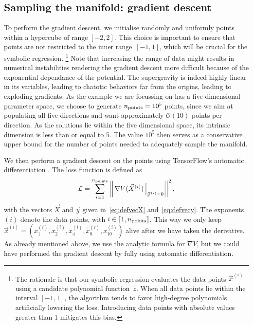 \documentclass[11pt,a4paper]{article}
\begin{document}
	\subsection{Sampling the manifold: gradient descent} \label{sec:graddes}
	To perform the gradient descent, we initialise randomly and uniformly points within a hypercube of range $[-2,2]$. This choice is important to ensure that points are not restricted to the inner range~$[-1,1]$, which will be crucial for the symbolic regression. \footnote{The rationale is that our symbolic regression evaluates the data points $\vec{x}^{(i)}$ using a candidate polynomial function~$z$. When all data points lie within the interval $[-1, 1]$, the algorithm tends to favor high-degree polynomials artificially lowering the loss. Introducing data points with absolute values greater than 1 mitigates this bias.}  Note that increasing the range of data might results in numerical instabilities rendering the gradient descent more difficult because of the exponential dependance of the potential. The supergravity is indeed highly linear in its variables, leading to chatotic behaviors far from the origins, leading to exploding gradients. As the example we are focussing on has a five-dimensional parameter space, we choose to generate $n_{\rm points}=10^5$ points, since we aim at populating all five directions and want approximately $\mathcal{O}(10)$ points per direction. As the solutions lie within the five dimensional space, its intrinsic dimension is less than or equal to 5. The value $10^5$ then serves as a conservative upper bound for the number of points needed to adequately sample the manifold.
	
	We then perform a gradient descent on the points using TensorFlow’s automatic differentiation \cite{tensorflow2015-whitepaper}. The loss function is defined as
	\begin{equation} \label{eq:lossgraddes}
		\mathcal{L} = \sum_{i = 1}^{n_{\rm points}} \left|\left|\left.\nabla V(\vec{X}^{(i)})\,\right|_{\vec{y}^{\,(i)}=0}\right|\right|^2,
	\end{equation}
with the vectors $\vec{X}$ and $\vec{y}$ given in~\eqref{eq:defvecX} and~\eqref{eq:defvecy}. The exponents $(i)$ denote the data points, with $i\in\llbracket1,n_{\rm points}\rrbracket$. This way we only keep $\vec{x}^{(i)} = (x^{(i)}_1,x^{(i)}_2,x^{(i)}_4,\tilde{x}^{(i)}_8,x^{(i)}_{10})$ alive after we have taken the derivative. As already mentioned above, we use the analytic formula for $\nabla V$, but we could have performed the gradient descent by fully using automatic differentiation.
\end{document}
